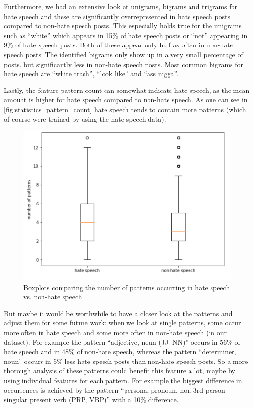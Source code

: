 \vspace{0.5cm}

Furthermore, we had an extensive look at unigrams, bigrams and trigrams for hate speech and these are significantly overrepresented in hate speech posts compared to non-hate speech posts. This especially holds true for the unigrams such as \enquote{white} which appears in 15\% of hate speech posts or \enquote{not} appearing in 9\% of hate speech posts. Both of these appear only half as often in non-hate speech posts. The identified bigrams only show up in a very small percentage of posts, but significantly less in non-hate speech posts. Most common bigrams for hate speech are \enquote{white trash}, \enquote{look like} and \enquote{ass nigga}.

\vspace{0.5cm}

Lastly, the feature pattern-count can somewhat indicate hate speech, as the mean amount is higher for hate speech compared to non-hate speech. As one can see in \autoref{fig:statistics_pattern_count} hate speech tends to contain more patterns (which of course were trained by using the hate speech data).

\begin{figure}[ht]
	\centering
	\includegraphics[width=0.7\linewidth]{figures/statistics_pattern_count.png}
	\caption{Boxplots comparing the number of patterns occurring in hate speech vs. non-hate speech}
	\label{fig:statistics_pattern_count}
\end{figure}

But maybe it would be worthwhile to have a closer look at the patterns and adjust them for some future work: when we look at single patterns, some occur more often in hate speech and some more often in non-hate speech (in our dataset). For example the pattern \enquote{adjective, noun (JJ, NN)} occurs in 56\% of hate speech and in 48\% of non-hate speech, whereas the pattern \enquote{determiner, noun} occurs in 5\% less hate speech posts than non-hate speech posts. So a more thorough analysis of these patterns could benefit this feature a lot, maybe by using individual features for each pattern. For example the biggest difference in occurrences is achieved by the pattern \enquote{personal pronoun, non-3rd person singular present verb (PRP, VBP)} with a 10\% difference.

